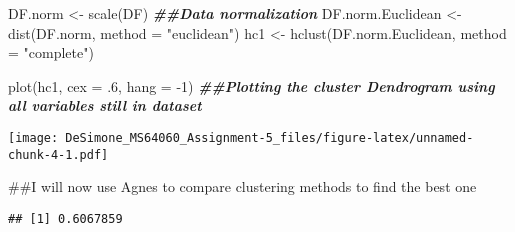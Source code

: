 \documentclass[
]{article}
\newenvironment{Shaded}{\begin{snugshade}}{\end{snugshade}}
\newcommand{\AttributeTok}[1]{\textcolor[rgb]{0.77,0.63,0.00}{#1}}
\newcommand{\DecValTok}[1]{\textcolor[rgb]{0.00,0.00,0.81}{#1}}
\newcommand{\DocumentationTok}[1]{\textcolor[rgb]{0.56,0.35,0.01}{\textbf{\textit{#1}}}}
\newcommand{\FunctionTok}[1]{\textcolor[rgb]{0.00,0.00,0.00}{#1}}
\newcommand{\NormalTok}[1]{#1}
\newcommand{\OtherTok}[1]{\textcolor[rgb]{0.56,0.35,0.01}{#1}}
\newcommand{\SpecialCharTok}[1]{\textcolor[rgb]{0.00,0.00,0.00}{#1}}
\newcommand{\StringTok}[1]{\textcolor[rgb]{0.31,0.60,0.02}{#1}}
\begin{document}
\begin{Shaded}
\begin{Highlighting}[]
\NormalTok{DF.norm }\OtherTok{\textless{}{-}} \FunctionTok{scale}\NormalTok{(DF) }\DocumentationTok{\#\#Data normalization}
\NormalTok{DF.norm.Euclidean }\OtherTok{\textless{}{-}} \FunctionTok{dist}\NormalTok{(DF.norm, }\AttributeTok{method =} \StringTok{"euclidean"}\NormalTok{)}
\NormalTok{hc1 }\OtherTok{\textless{}{-}} \FunctionTok{hclust}\NormalTok{(DF.norm.Euclidean, }\AttributeTok{method =} \StringTok{"complete"}\NormalTok{)}

\FunctionTok{plot}\NormalTok{(hc1, }\AttributeTok{cex =}\NormalTok{ .}\DecValTok{6}\NormalTok{, }\AttributeTok{hang =} \SpecialCharTok{{-}}\DecValTok{1}\NormalTok{) }\DocumentationTok{\#\#Plotting the cluster Dendrogram using all variables still in dataset}
\end{Highlighting}
\end{Shaded}

\texttt{[image: DeSimone\_MS64060\_Assignment-5\_files/figure-latex/unnamed-chunk-4-1.pdf]}

\#\#I will now use Agnes to compare clustering methods to find the best
one

\begin{Shaded}
\end{Shaded}

\begin{verbatim}
## [1] 0.6067859
\end{verbatim}

\begin{Shaded}
\end{Shaded}
\end{document}
